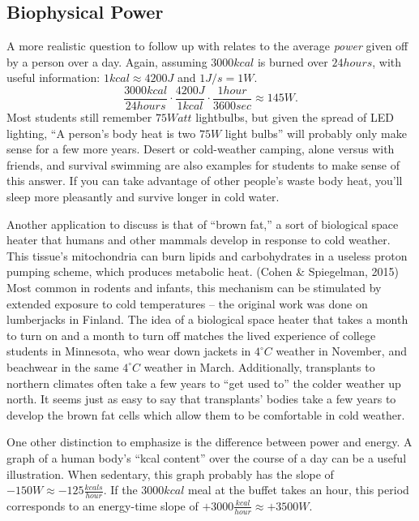 \documentclass[jou]{apa7}
\newcommand{\be}{\begin{equation}}
\newcommand{\ee}{\end{equation}}
\newcommand{\degC}{^{\circ}C}
\begin{document}
\subsection{Biophysical Power}
A more realistic question to follow up with relates to the average \textit{power} given off by a person over a day.  
Again, assuming $3000kcal$ is burned over $24 hours$, with useful information: $1 kcal \approx 4200J$ and $1 J/s=1W$.
\be
\frac{3000kcal}{24hours}\cdot\frac{4200J}{1kcal}\cdot\frac{1hour}{3600sec}\approx145W .
\ee
Most students still remember $75Watt$ lightbulbs, but given the spread of LED lighting, ``A person's body heat is two $75W$ light bulbs'' will probably only make sense for a few more years.  Desert or cold-weather camping, alone versus with friends, and survival swimming are also examples for students to make sense of this answer.  If you can take advantage of other people's waste body heat, you'll sleep more pleasantly and survive longer in cold water.  

Another application to discuss is that of ``brown fat,'' a sort of biological space heater that humans and other mammals develop in response to cold weather.  This tissue's mitochondria can burn lipids and carbohydrates in a useless proton pumping scheme, which produces metabolic heat. (Cohen \& Spiegelman, 2015)\cite{brown_fat_1,brown_fat_2,brown_fat_3,brown_fat_4}  Most common in rodents and infants, this mechanism can be stimulated by extended exposure to cold temperatures -- the original work was done on lumberjacks in Finland.\cite{finland_lumberjacks}  
The idea of a biological space heater that takes a month to turn on and a month to turn off matches the lived experience of college students in Minnesota, who wear down jackets in $4\degC$ weather in November, and beachwear in the same $4\degC$ weather in March.  Additionally, transplants to northern climates often take a few years to ``get used to'' the colder weather up north. It seems just as easy to say that transplants' bodies take a few years to develop the brown fat cells which allow them to be comfortable in cold weather.

One other distinction to emphasize is the difference between power and energy.  A graph of a human body's ``kcal content'' over the course of a day can be a useful illustration.  When sedentary, this graph probably has the slope of $-150W\approx -125 \frac{kcals}{hour}$.  If the $3000kcal$ meal at the buffet takes an hour, this period corresponds to an energy-time slope of 
$+3000\frac{kcal}{hour}\approx +3500W$.  
\end{document}
